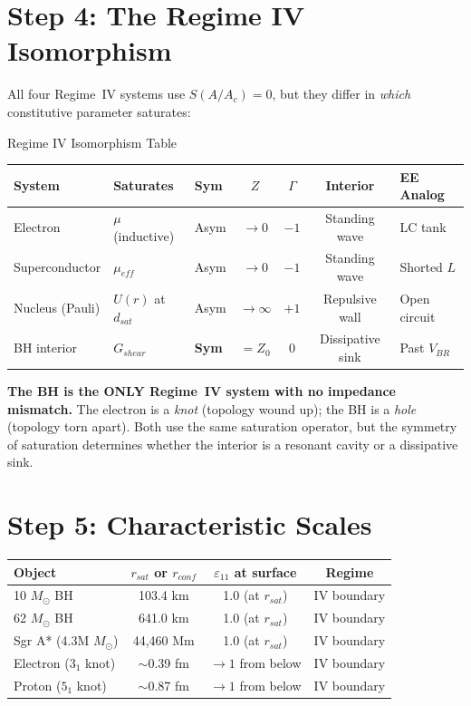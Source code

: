 \section{Step 4: The Regime IV Isomorphism}

All four Regime~IV systems use $S(A/A_c) = 0$, but they differ
in \textit{which} constitutive parameter saturates:

\begin{resultbox}{Regime IV Isomorphism Table}
\begin{center}
\begin{tabular}{lllcccl}
\toprule
\textbf{System} & \textbf{Saturates} & \textbf{Sym} & $Z$ & $\Gamma$ & \textbf{Interior} & \textbf{EE Analog} \\
\midrule
Electron          & $\mu$ (inductive) & Asym & $\to 0$   & $-1$ & Standing wave & LC tank \\
Superconductor    & $\mu_{eff}$       & Asym & $\to 0$   & $-1$ & Standing wave & Shorted $L$ \\
Nucleus (Pauli)   & $U(r)$ at $d_{sat}$ & Asym & $\to\infty$ & $+1$ & Repulsive wall & Open circuit \\
BH interior       & $G_{shear}$       & \textbf{Sym}  & $= Z_0$   & $0$  & Dissipative sink & Past $V_{BR}$ \\
\bottomrule
\end{tabular}
\end{center}
\end{resultbox}

\noindent
\textbf{The BH is the ONLY Regime~IV system with no impedance mismatch.}
The electron is a \textit{knot} (topology wound up);
the BH is a \textit{hole} (topology torn apart).
Both use the same saturation operator, but the symmetry of saturation
determines whether the interior is a resonant cavity or a dissipative sink.

\section{Step 5: Characteristic Scales}

\begin{center}
\begin{tabular}{lccc}
\toprule
\textbf{Object} & $r_{sat}$ or $r_{conf}$ & $\varepsilon_{11}$ at surface & Regime \\
\midrule
10 $M_\odot$ BH     & 103.4 km  & 1.0 (at $r_{sat}$) & IV boundary \\
62 $M_\odot$ BH     & 641.0 km  & 1.0 (at $r_{sat}$) & IV boundary \\
Sgr A* (4.3M $M_\odot$) & 44,460 Mm & 1.0 (at $r_{sat}$) & IV boundary \\
Electron ($3_1$ knot) & $\sim$0.39 fm & $\to 1$ from below & IV boundary \\
Proton ($5_1$ knot)   & $\sim$0.87 fm & $\to 1$ from below & IV boundary \\
\bottomrule
\end{tabular}
\end{center}

